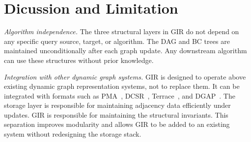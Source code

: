 \section{Dicussion and Limitation}
\label{sec:discussion}




\textit{Algorithm independence.}
The three structural layers in GIR do not depend on any specific query
source, target, or algorithm.
The DAG and BC trees are maintained unconditionally
after each graph update.
Any downstream algorithm can use these structures without
prior knowledge.

\textit{Integration with other dynamic graph systems.}
GIR is designed to operate above existing dynamic graph representation
systems, not to replace them.
It can be integrated with formats such as
PMA~\cite{bender2007adaptive},
DCSR~\cite{king2016dynamic},
Terrace~\cite{pandey2021terrace}, and
DGAP~\cite{islam2023dgap}.
The storage layer is responsible for maintaining adjacency data
efficiently under updates.
GIR is responsible for maintaining the structural invariants.
This separation improves modularity and allows GIR to be added to an existing system without redesigning the storage stack.

